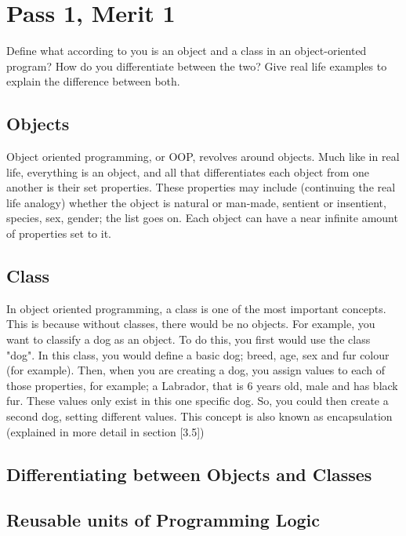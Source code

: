 \documentclass[twocolumn, twoside, titlepage]{article}
\begin{document}
\section{Pass 1, Merit 1}
Define what according to you is an object and a class in an object-oriented program? How do you differentiate between the two? Give real life examples to explain the difference between both.

\subsection{Objects}
Object oriented programming, or OOP, revolves around objects. Much like in real life, everything is an object, and all that differentiates each object from one another is their set properties. These properties may include (continuing the real life analogy) whether the object is natural or man-made, sentient or insentient, species, sex, gender; the list goes on. Each object can have a near infinite amount of properties set to it. 

\subsection{Class}
In object oriented programming, a class is one of the most important concepts. This is because without classes, there would be no objects. For example, you want to classify a dog as an object. To do this, you first would use the class "dog". In this class, you would define a basic dog; breed, age, sex and fur colour (for example). Then, when you are creating a dog, you assign values to each of those properties, for example; a Labrador, that is 6 years old, male and has black fur. These values only exist in this one specific dog. So, you could then create a second dog, setting different values. This concept is also known as encapsulation (explained in more detail in section [3.5])

\subsection{Differentiating between Objects and Classes}



\subsection{Reusable units of Programming Logic}
\end{document}
